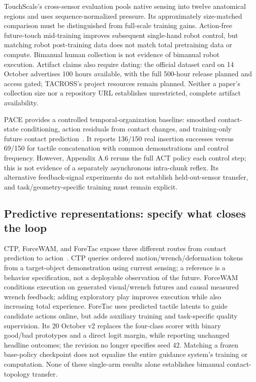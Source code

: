 TouchScale's cross-sensor evaluation pools native sensing into twelve anatomical
regions and uses sequence-normalized pressure. Its approximately size-matched
comparison must be distinguished from full-scale training gains. Action-free
future-touch mid-training improves subsequent single-hand robot control, but
matching robot post-training data does not match total pretraining data or compute.
Bimanual human collection is not evidence of bimanual robot execution. Artifact
claims also require dating: the official dataset card on 14 October advertises
100 hours available, with the full 500-hour release planned and access gated;
TACROSS's project resources remain planned. Neither a paper's collection size
nor a repository URL establishes unrestricted, complete artifact availability.

PACE provides a controlled temporal-organization baseline: smoothed contact-state
conditioning, action residuals from contact changes, and training-only future
contact prediction~\cite{chen2026pace}. It reports 136/150 real insertion successes
versus 69/150 for tactile concatenation with common demonstrations and control
frequency. However, Appendix A.6 reruns the full ACT policy each control step;
this is not evidence of a separately asynchronous intra-chunk reflex. Its
alternative feedback-signal experiments do not establish held-out-sensor
transfer, and task/geometry-specific training must remain explicit.

\subsection{Predictive representations: specify what closes the loop}

CTP, ForceWAM, and ForeTac expose three different routes from contact prediction
to action~\cite{nie2026ctp,xu2026forcewam,chen2026foretac}. CTP queries ordered
motion/wrench/deformation tokens from a target-object demonstration using current
sensing; a reference is a behavior specification, not a deployable observation
of the future. ForceWAM conditions execution on generated visual/wrench futures
and causal measured wrench feedback; adding exploratory play improves execution
while also increasing total experience. ForeTac uses predicted tactile latents
to guide candidate actions online, but adds auxiliary training and task-specific
quality supervision. Its 20 October v2 replaces the four-class scorer with
binary good/bad prototypes and a direct logit margin, while reporting unchanged
headline outcomes; the revision no longer specifies seed 42. Matching a frozen base-policy checkpoint does not equalize
the entire guidance system's training or computation. None of these single-arm
results alone establishes bimanual contact-topology transfer.

